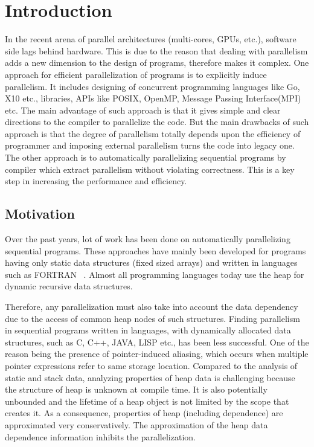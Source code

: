 \chapter{Introduction}
\label{ch:Intro}
In the recent arena of parallel architectures (multi-cores,
GPUs, etc.), software side lags behind hardware. This is due to the reason that dealing with 
parallelism adds a new dimension to the design of programs, therefore 
makes it complex. One approach for efficient parallelization of programs is to explicitly 
induce parallelism. It includes designing of concurrent programming languages like Go, X10 etc., 
libraries, APIs like POSIX, OpenMP, Message 
Passing Interface(MPI) etc. The main advantage of such approach is that it gives simple and clear directions to the 
compiler to parallelize the code. But the main drawbacks of such approach is that the degree of parallelism totally depends upon 
the efficiency of programmer and imposing external parallelism turns the code into legacy one. 
The other approach is to automatically 
parallelizing sequential programs by compiler which extract parallelism 
without violating correctness. This is a key step in increasing
the performance and efficiency. 
%
\section{Motivation}
Over the past years, lot of work has been done on automatically 
parallelizing sequential programs. These approaches have mainly 
been developed for programs having only static data structures 
(fixed sized arrays) and written in languages such as FORTRAN
~\cite{Allen87automatic,Banerjee93automatic,Wolf91loop,
  Kennedy01Optimizing}. Almost all programming languages
today use the heap for dynamic recursive data structures. 

Therefore, any parallelization must also take into account the data
dependency due to the access of common heap nodes of such 
structures. Finding parallelism in sequential programs written
in languages, with dynamically allocated data structures, such
as C, C++, JAVA, LISP etc., has been less successful. One of
the reason being the presence of pointer-induced aliasing,
which occurs when multiple pointer expressions refer to same
storage location. Compared to the analysis of static and
stack data, analyzing properties of heap data is challenging
because the structure of heap is unknown at compile time. It
is also potentially unbounded and the lifetime of a heap
object is not limited by the scope that creates it. As a
consequence, properties of heap (including dependence) are
approximated very conservatively. The approximation of the
heap data dependence information inhibits the parallelization. 

